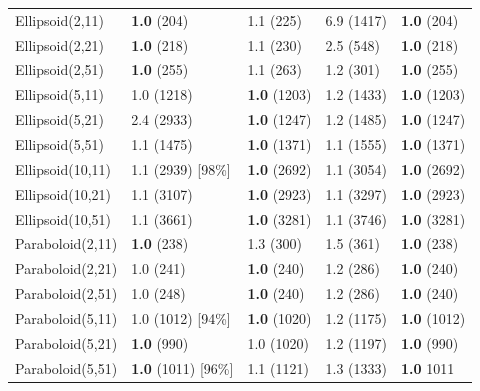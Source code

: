 \documentclass[fontsize=12, a4aper]{scrartcl}
\begin{document}
\begin{table}[H]
\begin{tabularx}{\linewidth}{X X X X X}
			Ellipsoid(2,11) & \textbf{1.0} (204) & 1.1 (225) & 6.9 (1417) & \textbf{1.0} (204)\\
			
			Ellipsoid(2,21) & \textbf{1.0} (218) & 1.1 (230) & 2.5 (548) & \textbf{1.0} (218)\\
			
			Ellipsoid(2,51) & \textbf{1.0} (255) & 1.1 (263) & 1.2 (301) & \textbf{1.0} (255)\\
			
			Ellipsoid(5,11) & 1.0 (1218) & \textbf{1.0} (1203) & 1.2 (1433) & \textbf{1.0} (1203)\\
			
			Ellipsoid(5,21) & 2.4 (2933) & \textbf{1.0} (1247) & 1.2 (1485) & \textbf{1.0} (1247)\\
			
			Ellipsoid(5,51) & 1.1 (1475) & \textbf{1.0} (1371) & 1.1 (1555) & \textbf{1.0} (1371)\\
			
			Ellipsoid(10,11) & 1.1 (2939) [98\%] & \textbf{1.0} (2692) & 1.1 (3054) & \textbf{1.0} (2692)\\
			
			Ellipsoid(10,21) & 1.1 (3107) & \textbf{1.0} (2923) & 1.1 (3297) & \textbf{1.0} (2923)\\
			
			Ellipsoid(10,51) & 1.1 (3661) & \textbf{1.0} (3281) & 1.1 (3746) & \textbf{1.0} (3281)\\
			
			Paraboloid(2,11) & \textbf{1.0} (238) & 1.3 (300) & 1.5 (361) & \textbf{1.0} (238)\\
			
			Paraboloid(2,21) & 1.0 (241) & \textbf{1.0} (240) & 1.2 (286) & \textbf{1.0} (240)\\
			
			Paraboloid(2,51) & 1.0 (248) & \textbf{1.0} (240) & 1.2 (286) & \textbf{1.0} (240)\\
			
			Paraboloid(5,11) & 1.0 (1012) [94\%] & \textbf{1.0} (1020) & 1.2 (1175) & \textbf{1.0} (1012)\\
			
			Paraboloid(5,21) & \textbf{1.0} (990) & 1.0 (1020) & 1.2 (1197) & \textbf{1.0} (990)\\
			
			Paraboloid(5,51) & \textbf{1.0} (1011) [96\%] & 1.1 (1121) & 1.3 (1333) & \textbf{1.0} 1011\\
			

\end{tabularx}
\end{table}
\end{document}
